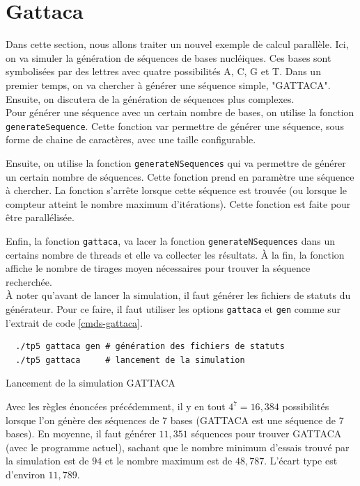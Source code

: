 \documentclass[a4paper]{article}
\begin{document}
\clearpage
\section{Gattaca}

Dans cette section, nous allons traiter un nouvel exemple de calcul parallèle.
Ici, on va simuler la génération de séquences de bases nucléiques. Ces bases
sont symbolisées par des lettres avec quatre possibilités A, C, G et T. Dans un
premier temps, on va chercher à générer une séquence simple, "GATTACA". Ensuite,
on discutera de la génération de séquences plus complexes.\\

Pour générer une séquence avec un certain nombre de bases, on utilise la
fonction \texttt{generateSequence}. Cette fonction var permettre de générer
une séquence, sous forme de chaine de caractères, avec une taille configurable.

Ensuite, on utilise la fonction \texttt{generateNSequences} qui va permettre
de générer un certain nombre de séquences. Cette fonction prend en paramètre une
séquence à chercher. La fonction s'arrête lorsque cette séquence est trouvée (ou
lorsque le compteur atteint le nombre maximum d'itérations). Cette fonction est
faite pour être parallélisée.

Enfin, la fonction \texttt{gattaca}, va lacer la fonction
\texttt{generateNSequences} dans un certains nombre de threads et elle va
collecter les résultats. À la fin, la fonction affiche le nombre de tirages
moyen nécessaires pour trouver la séquence recherchée.\\

À noter qu'avant de lancer la simulation, il faut générer les fichiers de
statuts du générateur. Pour ce faire, il faut utiliser les options
\texttt{gattaca} et \texttt{gen} comme sur l'extrait de code \ref{cmds-gattaca}.

\begin{listing}
\begin{verbatim}
  ./tp5 gattaca gen # génération des fichiers de statuts
  ./tp5 gattaca     # lancement de la simulation
\end{verbatim}
\caption{Lancement de la simulation GATTACA}
\label{cmds-gattaca}
\end{listing}

Avec les règles énoncées précédemment, il y en tout $4^7 = 16,384$ possibilités
lorsque l'on génère des séquences de 7 bases (GATTACA est une séquence de 7
bases). En moyenne, il faut générer $11,351$ séquences pour trouver GATTACA (avec
le programme actuel), sachant que le nombre minimum d'essais trouvé par la
simulation est de $94$ et le nombre maximum est de $48,787$. L'écart type est
d'environ $11,789$.\\
\end{document}
